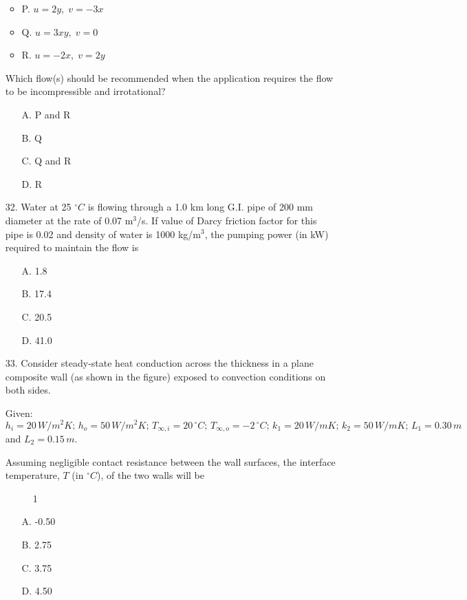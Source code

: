\documentclass[journal]{IEEEtran}
\begin{document}
\begin{enumerate}
\begin{itemize}
    \item P. $u = 2y, \; v = -3x$
    \item Q. $u = 3xy, \; v = 0$
    \item R. $u = -2x, \; v = 2y$
\end{itemize}

Which flow(s) should be recommended when the application requires the flow to be incompressible and irrotational?
\begin{enumerate}
    \item [A.] P and R
    \item [B.] Q
    \item [C.] Q and R
    \item [D.] R
  \end{enumerate}
\item[32.] Water at 25 $^\circ C$ is flowing through a 1.0 km long G.I. pipe of 200 mm diameter at the rate of 0.07 m$^3$/s. If value of Darcy friction factor for this pipe is 0.02 and density of water is 1000 kg/m$^3$, the pumping power (in kW) required to maintain the flow is
\begin{enumerate}
    \item [A.] 1.8
    \item [B.] 17.4
    \item [C.] 20.5
    \item [D.] 41.0
  \end{enumerate}
  \item[33.] Consider steady-state heat conduction across the thickness in a plane composite wall (as shown in the figure) exposed to convection conditions on both sides.

Given: $h_i = 20 \, W/m^2K; \, h_o = 50 \, W/m^2K; \, T_{\infty,i} = 20 \,^\circ C; \, T_{\infty,o} = -2 \,^\circ C; \, k_1 = 20 \, W/mK; \, k_2 = 50 \, W/mK; \, L_1 = 0.30 \, m$ and $L_2 = 0.15 \, m$. 

Assuming negligible contact resistance between the wall surfaces, the interface temperature, $T$ (in $^\circ C$), of the two walls will be

 \begin{figure}[!ht]
    \centering
    \caption{ 1}
    \label{fig:composite wall}
    \end{figure}

\begin{enumerate}
    \item [A.] -0.50
    \item [B.] 2.75
    \item [C.] 3.75
    \item [D.] 4.50
  \end{enumerate}


\end{enumerate}
\end{document}
